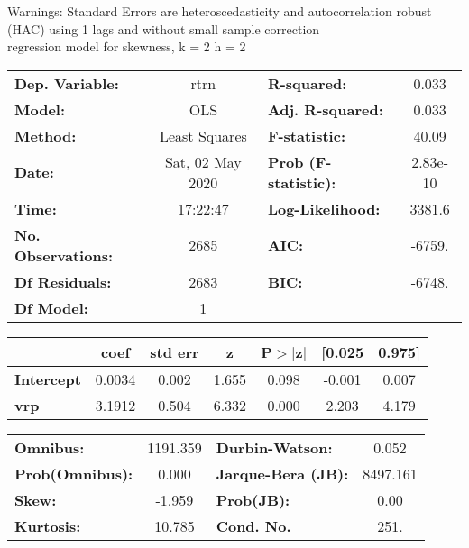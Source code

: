Warnings: \newline
 [1] Standard Errors are heteroscedasticity and autocorrelation robust (HAC) using 1 lags and without small sample correction\\ 

regression model for skewness, k = 2 h = 2\begin{center}
\begin{tabular}{lclc}
\toprule
\textbf{Dep. Variable:}    &       rtrn       & \textbf{  R-squared:         } &     0.033   \\
\textbf{Model:}            &       OLS        & \textbf{  Adj. R-squared:    } &     0.033   \\
\textbf{Method:}           &  Least Squares   & \textbf{  F-statistic:       } &     40.09   \\
\textbf{Date:}             & Sat, 02 May 2020 & \textbf{  Prob (F-statistic):} &  2.83e-10   \\
\textbf{Time:}             &     17:22:47     & \textbf{  Log-Likelihood:    } &    3381.6   \\
\textbf{No. Observations:} &        2685      & \textbf{  AIC:               } &    -6759.   \\
\textbf{Df Residuals:}     &        2683      & \textbf{  BIC:               } &    -6748.   \\
\textbf{Df Model:}         &           1      & \textbf{                     } &             \\
\bottomrule
\end{tabular}
\begin{tabular}{lcccccc}
                   & \textbf{coef} & \textbf{std err} & \textbf{z} & \textbf{P$> |$z$|$} & \textbf{[0.025} & \textbf{0.975]}  \\
\midrule
\textbf{Intercept} &       0.0034  &        0.002     &     1.655  &         0.098        &       -0.001    &        0.007     \\
\textbf{vrp}       &       3.1912  &        0.504     &     6.332  &         0.000        &        2.203    &        4.179     \\
\bottomrule
\end{tabular}
\begin{tabular}{lclc}
\textbf{Omnibus:}       & 1191.359 & \textbf{  Durbin-Watson:     } &    0.052  \\
\textbf{Prob(Omnibus):} &   0.000  & \textbf{  Jarque-Bera (JB):  } & 8497.161  \\
\textbf{Skew:}          &  -1.959  & \textbf{  Prob(JB):          } &     0.00  \\
\textbf{Kurtosis:}      &  10.785  & \textbf{  Cond. No.          } &     251.  \\
\bottomrule
\end{tabular}
\end{center}

